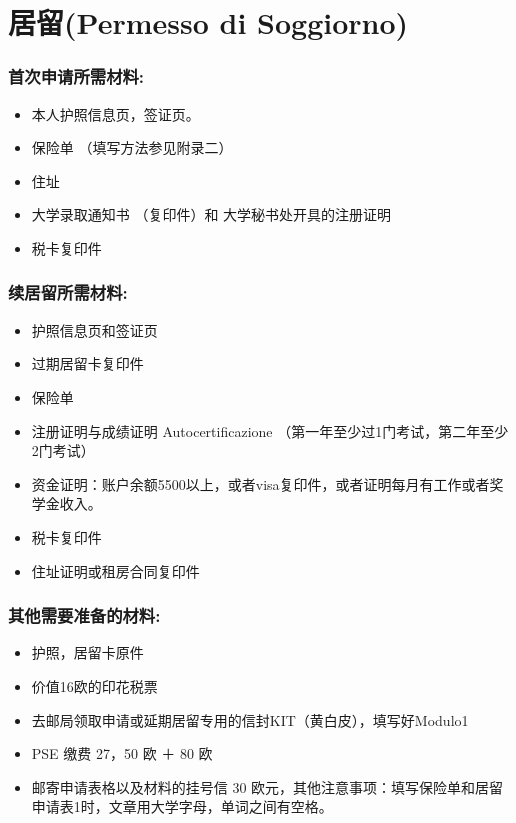 \section{居留(Permesso di Soggiorno)}
\subsubsection{首次申请所需材料:}
\begin{itemize} 
\item 本人护照信息页，签证页。
\item 保险单 （填写方法参见附录二）
\item 住址
\item 大学录取通知书 （复印件）和 大学秘书处开具的注册证明
\item 税卡复印件
\end{itemize}

\subsubsection{续居留所需材料:}
\begin{itemize} 
\item 护照信息页和签证页
\item 过期居留卡复印件
\item 保险单
\item 注册证明与成绩证明 Autocertificazione （第一年至少过1门考试，第二年至少2门考试）
\item 资金证明：账户余额5500以上，或者visa复印件，或者证明每月有工作或者奖学金收入。
\item 税卡复印件
\item 住址证明或租房合同复印件
\end{itemize}

\subsubsection{其他需要准备的材料:}
\begin{itemize} 
\item 护照，居留卡原件
\item 价值16欧的印花税票
\item 去邮局领取申请或延期居留专用的信封KIT（黄白皮），填写好Modulo1
\item PSE 缴费 27，50 欧 ＋ 80 欧
\item 邮寄申请表格以及材料的挂号信 30 欧元，其他注意事项：填写保险单和居留申请表1时，文章用大学字母，单词之间有空格。
\end{itemize}


